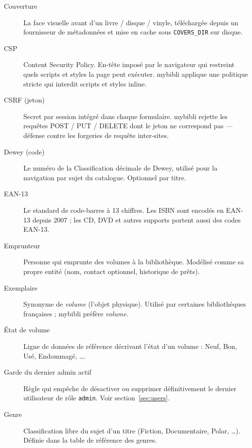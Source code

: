 \begin{description}
  \item[Couverture] La face visuelle avant d'un
        livre / disque / vinyle, téléchargée depuis un fournisseur
        de métadonnées et mise en cache sous \texttt{COVERS\_DIR}
        sur disque.

  \item[CSP] Content Security Policy. En-tête imposé par le
        navigateur qui restreint quels scripts et styles la page
        peut exécuter. mybibli applique une politique stricte qui
        interdit scripts et styles inline.

  \item[CSRF (jeton)] Secret par session intégré dans
        chaque formulaire. mybibli rejette les requêtes POST /
        PUT / DELETE dont le jeton ne correspond pas — défense
        contre les forgeries de requête inter-sites.

  \item[Dewey (code)] Le numéro de la Classification
        décimale de Dewey, utilisé pour la navigation par sujet
        du catalogue. Optionnel par titre.

  \item[EAN-13] Le standard de code-barres à 13 chiffres. Les ISBN
        sont encodés en EAN-13 depuis 2007 ; les CD, DVD et autres
        supports portent aussi des codes EAN-13.

  \item[Emprunteur] Personne qui emprunte des
        volumes à la bibliothèque. Modélisé comme sa propre entité
        (nom, contact optionnel, historique de prêts).

  \item[Exemplaire] Synonyme de \emph{volume} (l'objet physique).
        Utilisé par certaines bibliothèques françaises ; mybibli
        préfère \emph{volume}.

  \item[État de volume] Ligne de données de
        référence décrivant l'état d'un volume : Neuf, Bon, Usé,
        Endommagé, \dots.

  \item[Garde du dernier admin actif]
        Règle qui empêche de désactiver ou supprimer définitivement
        le dernier utilisateur de rôle \texttt{admin}. Voir
        section~\ref{sec:users}.

  \item[Genre] Classification libre du sujet d'un
        titre (Fiction, Documentaire, Polar, \dots). Définie dans
        la table de référence des genres.


\end{description}
